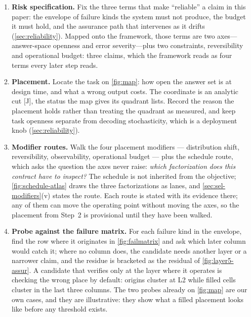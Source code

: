 \begin{enumerate}[leftmargin=1.6em, itemsep=2pt]
\item \textbf{Risk specification.} Fix the three terms that make ``reliable'' a claim in this
  paper: the envelope of failure kinds the system must not produce, the budget it must hold, and
  the assurance path that intervenes as it drifts (\cref{sec:reliability}). Mapped onto the
  framework, those terms are two axes---answer-space openness and error severity---plus two
  constraints, reversibility and operational budget: three claims, which the framework reads as
  four terms every later step reads.

\item \textbf{Placement.} Locate the task on \cref{fig:map}: how open the answer set is at design
  time, and what a wrong output costs. The coordinate is an analytic cut [J], the status the map
  gives its quadrant lists. Record the reason the placement holds rather than treating the
  quadrant as measured, and keep task openness separate from decoding stochasticity, which is a
  deployment knob (\cref{sec:reliability}).

\item \textbf{Modifier routes.} Walk the four placement modifiers --- distribution shift,
  reversibility, observability, operational budget --- plus the schedule route, which asks the
  question the axes never raise: \emph{which factorization does this contract have to inspect?}
  The schedule is not inherited from the objective; \cref{fig:schedule-atlas} draws the three
  factorizations as lanes, and \cref{sec:sel-modifiers}(v) states the route. Each route is stated
  with its evidence there; any of them can move the operating point without
  moving the axes, so the placement from Step~2 is provisional until they have been walked.

\item \textbf{Probe against the failure matrix.} For each failure kind in the envelope, find the
  row where it originates in \cref{fig:failmatrix} and ask which later column would catch it;
  where no column does, the candidate needs another layer or a narrower claim, and the residue is
  bracketed as the residual of \cref{fig:layer5-assur}. A candidate that verifies only at the
  layer where it operates is checking the wrong place by default: origins cluster at L2 while
  filled cells cluster in the last three columns. The two probes already on
  \cref{fig:map} are our own cases, and they are illustrative: they show what a filled placement
  looks like before any threshold exists.


\end{enumerate}

